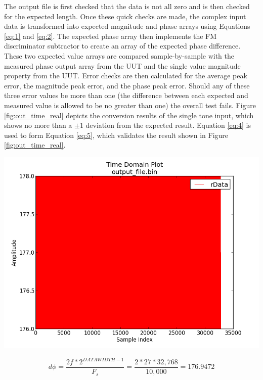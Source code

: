 \documentclass{article}
\begin{document}
	\noindent The output file is first checked that the data is not all zero and is then checked for the expected length. Once these quick checks are made, the complex input data is transformed into expected magnitude and phase arrays using Equations \ref{eq:1} and \ref{eq:2}. The expected phase array then implements the FM discriminator subtractor to create an array of the expected phase difference. These two expected value arrays are compared sample-by-sample with the measured phase output array from the UUT and the single value magnitude property from the UUT. Error checks are then calculated for the average peak error, the magnitude peak error, and the phase peak error. Should any of these three error values be more than one (the difference between each expected and measured value is allowed to be no greater than one) the overall test fails. Figure \ref{fig:out_time_real} depicts the conversion results of the single tone input, which shows no more than a $\pm1$ deviation from the expected result. Equation \ref{eq:4} is used to form Equation \ref{eq:5}, which validates the result shown in Figure \ref{fig:out_time_real}.

{\centering\captionsetup{type=figure}\includegraphics[scale=0.4]{output_time_real}\par{}\label{fig:out_time_real}}

\begin{equation} \label{eq:5}
	d\phi = \frac{2f*2^{DATAWIDTH-1}}{F_s} = \frac{2*27*32,768}{10,000} = 176.9472
\end{equation}
\end{document}
